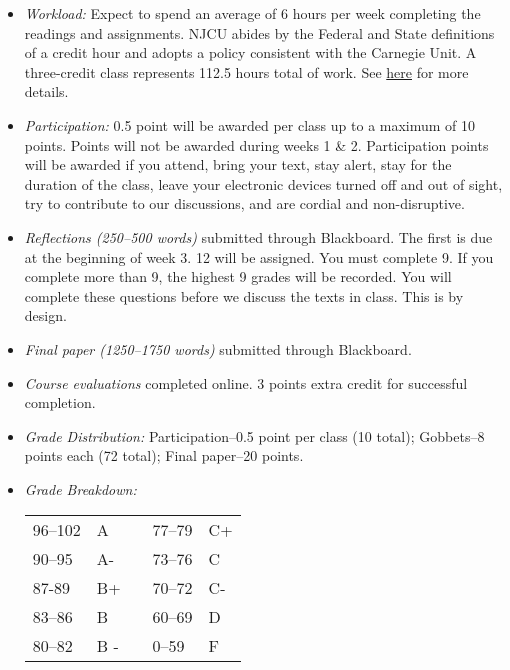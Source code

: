 \documentclass[article,oneside]{memoir}
\begin{document}
\begin{itemize}
\item \textit{Workload:} Expect to spend an average of 6 hours per week completing the readings and assignments. NJCU abides by the Federal and State definitions of a credit hour and adopts a policy consistent with the Carnegie Unit. A three-credit class represents 112.5 hours total of work. See \href{http://scottoconnor.org/resources/Credit.pdf}{here} for more details.

\item \textit{Participation:} 0.5 point will be awarded per class up to a maximum of 10 points. Points will not be awarded during weeks 1 \& 2. Participation points will be awarded if you attend, bring your text, stay alert, stay for the duration of the class, leave your electronic devices turned off and out of sight, try to contribute to our discussions, and are cordial and non-disruptive. 


\item \textit{Reflections (250--500 words)} submitted through Blackboard. The first is due at the beginning of week 3. 12 will be assigned. You must complete 9. If you complete more than 9, the highest 9 grades will be recorded. You will complete these questions before we discuss the texts in class. This is by design. 



\item \textit{Final paper  (1250--1750 words) } submitted through Blackboard. 

\item \textit{Course evaluations} completed online. 3 points extra credit for successful completion.

\item \textit{Grade Distribution:} Participation--0.5 point per class (10 total); Gobbets--8 points each (72 total); Final paper--20 points. 

\item \textit{Grade Breakdown:}

 \begin{tabular}{ | l | l | p{2cm} | l | l | }
    \hline 
96--102 & A  & &  77--79 &  C+ \\  
90--95 & A- & &  73--76 & C \\
87-89 & B+ &  &  70--72 & C- \\ 
83--86 & B  & &  60--69 & D\\
80--82 & B - & & 0--59 & F\\ \hline
    \end{tabular}


\end{itemize}
\end{document}
